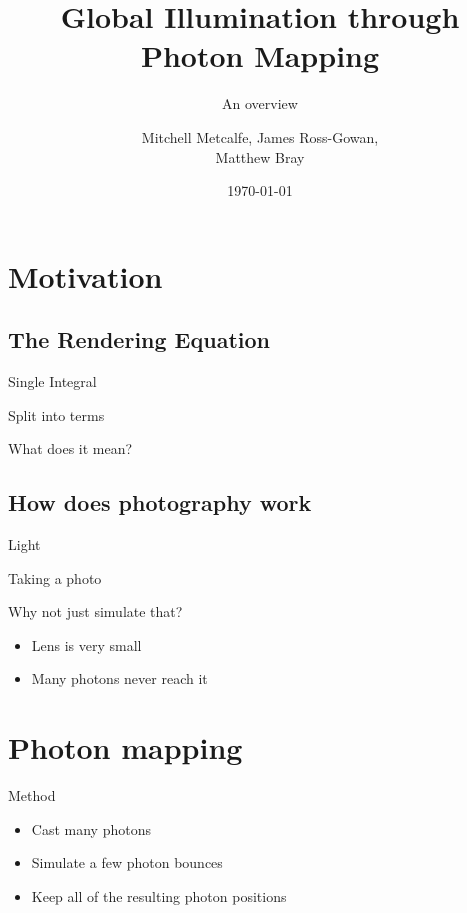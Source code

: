 \documentclass{beamer}
\title[COMP3320 Background Presentation]{Global Illumination through Photon Mapping}
\subtitle{An overview}
\author{Mitchell Metcalfe, James Ross-Gowan,\\ Matthew Bray}
\institute{University of Newcastle}
\date{\today}
\begin{document}
	\maketitle
	
	\section{Motivation}

		\subsection{The Rendering Equation}
			\begin{frame}{Single Integral}\end{frame}
			\begin{frame}{Split into terms}\end{frame}
			\begin{frame}{What does it mean?}\end{frame}

		\subsection{How does photography work}
			\begin{frame}{Light}\end{frame}
			\begin{frame}{Taking a photo}\end{frame}
			\begin{frame}{Why not just simulate that?}
				\begin{itemize}
					\item<2-> Lens is very small
					\item<3-> Many photons never reach it
				\end{itemize}
			\end{frame}

	\section{Photon mapping}
		\begin{frame}{Method}
			\begin{itemize}
				\item<2-> Cast many photons
				\item<3-> Simulate a few photon bounces
				\item<4-> Keep all of the resulting photon positions
			\end{itemize}
		\end{frame}
		
\end{document}
